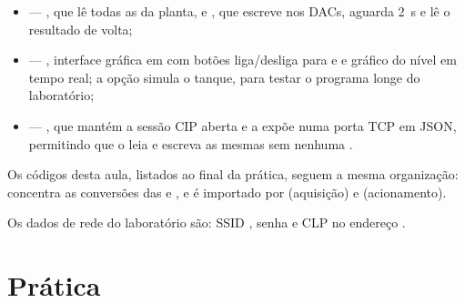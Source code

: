 \begin{itemize}
  \item {} --- , que lê todas as  da planta, e
    , que escreve nos DACs, aguarda \qty{2}{\second} e lê o resultado de volta;
  \item {} --- , interface gráfica em  com botões liga/desliga para
     e  e gráfico do nível em tempo real; a opção  simula o tanque, para testar
    o programa longe do laboratório;
  \item {} --- , que mantém a sessão CIP aberta e a expõe numa porta
    TCP em JSON, permitindo que o  leia e escreva as mesmas  sem nenhuma .
\end{itemize}

Os códigos desta aula, listados ao final da prática, seguem a mesma organização:  concentra
as conversões das  e , e é importado por  (aquisição) e
 (acionamento).

Os dados de rede do laboratório são: SSID , senha  e CLP no endereço
.


\section{Prática}

